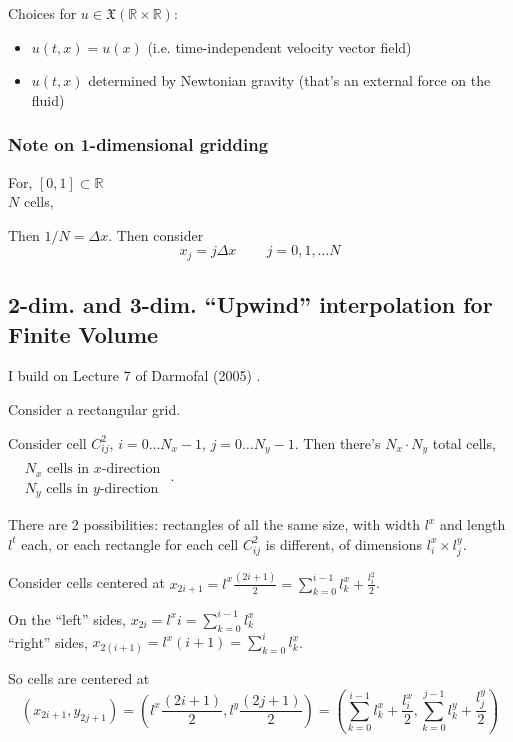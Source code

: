 \documentclass[10pt]{amsart}
\begin{document}
\begin{multicols*}{2}
Choices for $u\in \mathfrak{X}(\mathbb{R}\times \mathbb{R})$:
\begin{itemize}
\item $u(t,x) = u(x)$ (i.e. time-independent velocity vector field)
\item $u(t,x)$ determined by Newtonian gravity (that's an external force on the fluid)
  \end{itemize}

\subsubsection{Note on 1-dimensional gridding}

For, $[0,1] \subset \mathbb{R}$ \\
\phantom{For, } $N$ cells,

Then $1/N = \Delta x$.  Then consider
\[
x_j = j\Delta x \qquad \, j = 0, 1, \dots N
\]

\subsection{2-dim. and 3-dim. ``Upwind'' interpolation for Finite Volume}

I build on Lecture 7 of Darmofal (2005) \cite{Darm2005}.

Consider a rectangular grid.

Consider cell $C^2_{ij}$, $i=0\dots N_x - 1$, $j=0\dots N_y -1$.  Then there's $N_x\cdot N_y$ total cells, $\begin{aligned} & \quad \\
  & N_x \text{ cells in $x$-direction } \\ 
  & N_y \text{ cells in $y$-direction } \end{aligned}$.

There are 2 possibilities: rectangles of all the same size, with width $l^x$ and length $l^t$ each, or each rectangle for each cell $C^2_{ij}$ is different, of dimensions $l^x_i \times l^y_j$.  

Consider cells centered at $x_{2i+1} = l^x\frac{(2i+1)}{2} = \sum_{k=0}^{i-1}l_k^x + \frac{l_i^2}{2}$.  

On the ``left'' sides, $x_{2i} = l^x i = \sum_{k=0}^{i-1} l_k^x$ \\
\phantom{On the } ``right'' sides, $x_{2(i+1)} = l^x(i+1) = \sum_{k=0}^i l_k^x$.

So cells are centered at
\[
(x_{2i+1}, y_{2j+1}) = (l^x \frac{ (2i+1)}{2} , l^y \frac{(2j+1)}{2} ) = \left( \sum_{k=0}^{i-1} l_k^x + \frac{l_i^x}{2} , \sum_{k=0}^{j-1}l_k^y + \frac{l_j^y}{2} \right)
\]


\end{multicols*}
\end{document}
